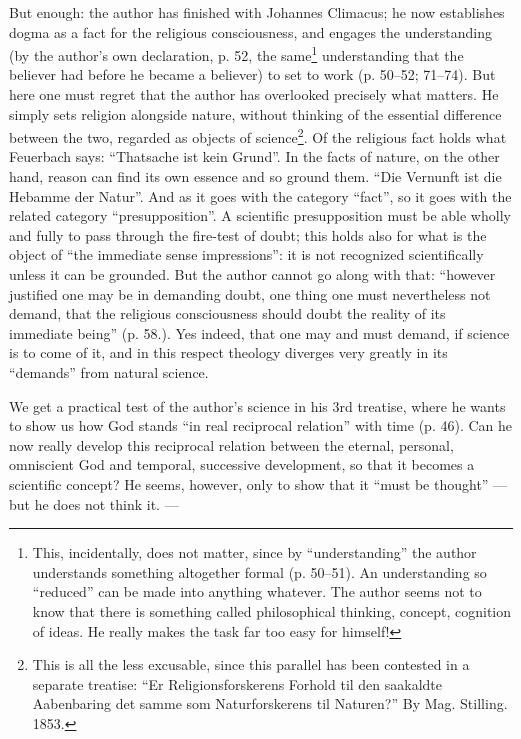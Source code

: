 \documentclass[12pt,a4paper]{book}
\newcommand{\opage}[1]{\marginnote{\footnotesize\textit{[#1]}}}
\begin{document}
But enough: the author has finished with Johannes
Climacus; he now establishes dogma as a fact
for the religious consciousness, and engages the understanding (by
the author's own declaration, p. 52, the same\footnote{This, incidentally, does not matter, since by ``understanding'' the author understands something altogether formal (p. 50--51). An understanding so ``reduced'' can be made into anything whatever. The author seems not to know that there is something called philosophical thinking, concept, cognition of ideas. He really makes the task far too easy for himself!} understanding that
the believer had before he became a believer) to set to work
(p. 50--52; 71--74). But here one must regret that the author
has overlooked precisely what matters. He simply sets
religion alongside nature, without thinking
of the essential difference between the two, regarded as objects
of science\footnote{This is all the less excusable, since this parallel has been contested in a separate treatise: ``Er Religionsforskerens Forhold til den saakaldte Aabenbaring det samme som Naturforskerens til Naturen?'' By Mag. Stilling. 1853.}. Of the religious fact
holds what Feuerbach says: ``Thatsache ist kein Grund''.
In the facts of nature, on the other hand, reason can find its
own essence and so ground them. ``Die Vernunft ist
die Hebamme der Natur''. And as it goes with the category
``fact'', so it goes with the related category
``presupposition''. A scientific presupposition must be able wholly and
fully to pass through the fire-test of doubt; this holds
also for what is the object of ``the immediate sense \opage{11}\setcounter{footnote}{0}impressions'':
it is not recognized scientifically unless it can be grounded.
But the author cannot go along with that: ``however justified
one may be in demanding doubt, one thing one must nevertheless
not demand, that the religious consciousness should doubt the reality
of its immediate being'' (p. 58.). Yes indeed, that one may and
must demand, if science is to come of it,
and in this respect theology diverges very greatly in its
``demands'' from natural science.

We get a practical test of the author's science in his
3rd treatise, where he wants to show us how God stands
``in real reciprocal relation'' with time (p. 46). Can he now
really develop this reciprocal relation between the eternal, personal,
omniscient God and temporal, successive development, so
that it becomes a scientific concept? He seems, however, only to
show that it ``must be thought'' --- but he does not think it. ---
\end{document}
